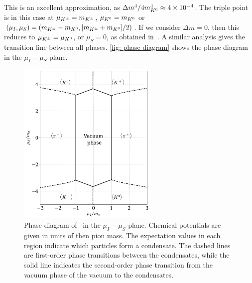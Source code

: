 %
This is an excellent approximation, as $\Delta m^4 / 4 m_{K^0}^4 \approx 4 \times 10^{-4}$.
The triple point is in this case at $\mu_{K^\pm} = m_{K^\pm}$, $\mu_{K^0} = m_{K^0}$ or $(\mu_I, \mu_S) = (m_{K^\pm} - m_{K^0}, [m_{K^\pm}+m_{K^0}]/2)$.
If we consider $\Delta m = 0$, then this reduces to $ \mu_{K^\pm} = \mu_{K^0}$, or $\mu_S = 0$, as obtained in~\autocite{kogutQCDSmallNonzero2001}.
A similar analysis gives the transition line between all phases.
\autoref{fig: phase diagram} shows the phase diagram in the $\mu_I-\mu_S$-plane.

\begin{figure}[!htb]
    \centering
    \includegraphics[width=0.6\textwidth]{../scripts/figurer/phase_diagram.pdf}
    \caption{
        Phase diagram of \chpt\ in the $\mu_I-\mu_S$-plane.
        Chemical potentials are given in units of then pion mass.
        The expectation values in each region indicate which particles form a condensate.
        The dashed lines are first-order phase transitions between the condensates, while the solid line indicates the second-order phase transition from the vacuum phase of the vacuum to the condensates.
        }
    \label{fig: phase diagram}
\end{figure}

